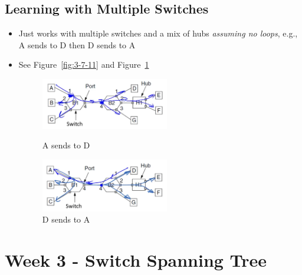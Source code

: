 \documentclass[12pt]{ctexart}   %
\begin{document}
	\subsection{ Learning with Multiple Switches}
	\begin{itemize}
		\item Just works with multiple switches and a mix of hubs \textit{assuming no loops}, e.g., A sends to D then D sends to A
		\item See Figure~\ref{fig:3-7-11} and Figure~\ref{fig:3-7-12}
	
		\begin{figure}
			\begin{minipage}[t]{0.5\linewidth}
				\centering
				\includegraphics[width=2.2in]{images/3-7-11}
				\caption{A sends to D}
				\label{fig:3-7-11}
			\end{minipage}
			\begin{minipage}[t]{0.5\linewidth}
				\centering
				\includegraphics[width=2.2in]{images/3-7-12}
				\caption{D sends to A}
				\label{fig:3-7-12}
			\end{minipage}
		\end{figure}
	\end{itemize}
	
\section{ Week 3 - Switch Spanning Tree }
\end{document}
